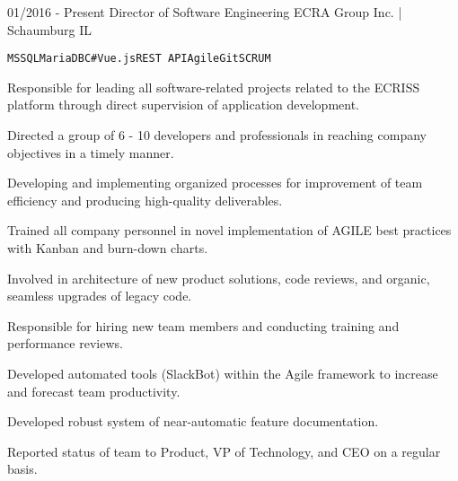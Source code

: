 \documentclass[9pt]{developercv} %
\begin{document}
\begin{entrylist}
	\entry
		{01/2016 - Present}
		{Director of Software Engineering}
		{ECRA Group Inc. | Schaumburg IL}
		{
		 \texttt{MSSQL}\slashsep\texttt{MariaDB}\slashsep\texttt{C\#}\slashsep\texttt{Vue.js}\slashsep\texttt{REST API}\slashsep\texttt{Agile}\slashsep\texttt{Git}\slashsep\texttt{SCRUM}\\
	 \begin{compactitem}
        \item Responsible for leading all software-related projects related to the ECRISS platform through direct supervision of application development.
        \item Directed a group of 6 - 10 developers and professionals in reaching company objectives in a timely manner.
        \item Developing and implementing organized processes for improvement of team efficiency and producing high-quality deliverables. 
        \item Trained all company personnel in novel implementation of AGILE best practices with Kanban and burn-down charts.
        \item   Involved in architecture of new product solutions, code reviews, and organic, seamless upgrades of legacy code. 
        \item Responsible for hiring new team members and conducting training and performance reviews. 
        \item Developed automated tools (SlackBot) within the Agile framework to increase and forecast team productivity.
        \item Developed robust system of near-automatic feature documentation.
        \item Reported status of team to Product, VP of Technology, and CEO on a regular basis.
    \end{compactitem}
    
}
\end{entrylist}
\end{document}
